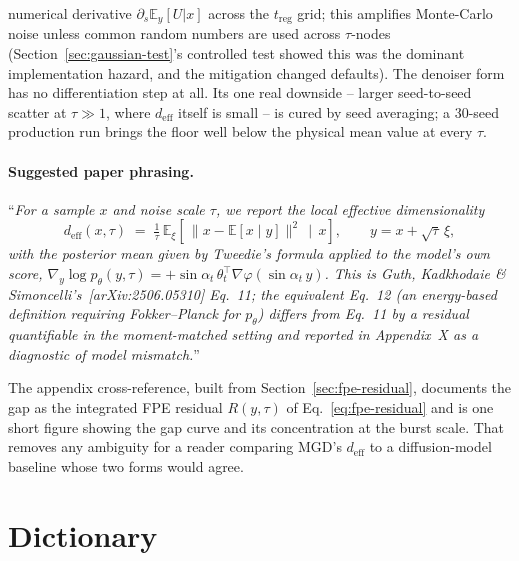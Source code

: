 \documentclass[11pt]{article}
\newcommand{\E}{\mathbb{E}}
\renewcommand{\_}{\origunderscore\allowbreak}
\newcommand{\deff}{d_{\mathrm{eff}}}
\begin{document}
\begin{enumerate}
        numerical derivative $\partial_s \E_y[U|x]$ across the
        $t_{\mathrm{reg}}$ grid; this amplifies Monte-Carlo noise unless
        common random numbers are used across $\tau$-nodes
        (Section~\ref{sec:gaussian-test}'s controlled test showed this
        was the dominant implementation hazard, and the mitigation
        changed defaults). The denoiser form has no differentiation step
        at all. Its one real downside -- larger seed-to-seed scatter at
        $\tau\gg 1$, where $\deff$ itself is small -- is cured by seed
        averaging; a $30$-seed production run brings the floor well below
        the physical mean value at every $\tau$.
\end{enumerate}

\paragraph{Suggested paper phrasing.} ``\emph{For a sample $x$ and noise
scale $\tau$, we report the local effective dimensionality
\[
  \deff(x,\tau) \;=\; \tfrac1\tau\, \E_\xi\!\left[\, \lVert x - \E[x\mid y]\rVert^2 \,\mid\, x \right],
  \qquad y = x + \sqrt\tau\,\xi,
\]
with the posterior mean given by Tweedie's formula applied to the model's
own score, $\nabla_y\log p_\theta(y,\tau) = +\sin\alpha_t\,\theta_t^\top
\nabla\varphi(\sin\alpha_t\, y)$. This is Guth, Kadkhodaie \&
Simoncelli's~[\emph{arXiv:2506.05310}] Eq.~11; the equivalent Eq.~12 (an
energy-based definition requiring Fokker--Planck for $p_\theta$) differs
from Eq.~11 by a residual quantifiable in the moment-matched setting and
reported in Appendix~X as a diagnostic of model mismatch.}''

The appendix cross-reference, built from Section~\ref{sec:fpe-residual},
documents the gap as the integrated FPE residual
$R(y,\tau)$ of Eq.~\ref{eq:fpe-residual} and is one short figure showing
the gap curve and its concentration at the burst scale. That removes any
ambiguity for a reader comparing MGD's $\deff$ to a diffusion-model
baseline whose two forms would agree.

\section{Dictionary}
\end{document}
